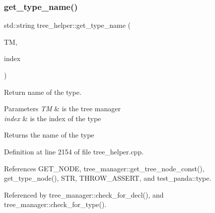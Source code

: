 \subsubsection{\texorpdfstring{get\+\_\+type\+\_\+name()}{get\_type\_name()}}
{\footnotesize\ttfamily std\+::string tree\+\_\+helper\+::get\+\_\+type\+\_\+name (\begin{DoxyParamCaption}\item[{const \hyperlink{tree__manager_8hpp_a792e3f1f892d7d997a8d8a4a12e39346}{tree\+\_\+manager\+Const\+Ref}}]{TM,  }\item[{const unsigned int}]{index }\end{DoxyParamCaption})\hspace{0.3cm}{\ttfamily [static]}}



Return name of the type. 


\begin{DoxyParams}{Parameters}
{\em TM} & is the tree manager \\
\hline
{\em index} & is the index of the type \\
\hline
\end{DoxyParams}
\begin{DoxyReturn}{Returns}
the name of the type 
\end{DoxyReturn}


Definition at line 2154 of file tree\+\_\+helper.\+cpp.



References G\+E\+T\+\_\+\+N\+O\+DE, tree\+\_\+manager\+::get\+\_\+tree\+\_\+node\+\_\+const(), get\+\_\+type\+\_\+node(), S\+TR, T\+H\+R\+O\+W\+\_\+\+A\+S\+S\+E\+RT, and test\+\_\+panda\+::type.



Referenced by tree\+\_\+manager\+::check\+\_\+for\+\_\+decl(), and tree\+\_\+manager\+::check\+\_\+for\+\_\+type().

